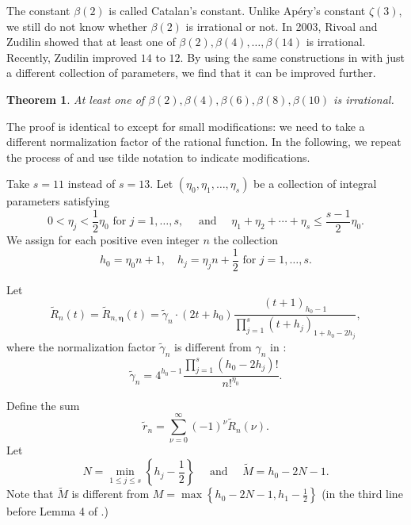 \documentclass[11pt]{amsart}
\newtheorem{theorem}{Theorem}[section]
\numberwithin{equation}{section}
\begin{document}
The constant $\beta(2)$ is called Catalan's constant. Unlike Ap{\'e}ry's constant $\zeta(3)$, we still do not know whether $\beta(2)$ is irrational or not. In 2003, Rivoal and Zudilin \cite{RZ03} showed that at least one of $\beta(2),\beta(4),\ldots,\beta(14)$ is irrational. Recently, Zudilin \cite{Zu19} improved $14$ to $12$. By using the same constructions in \cite{Zu19} with just a different collection of parameters, we find that it can be improved further.

\begin{theorem}\label{secondtheorem}
At least one of $\beta(2),\beta(4),\beta(6),\beta(8),\beta(10)$ is irrational.
\end{theorem}

The proof is identical to \cite[\S 3]{Zu19} except for small modifications: we need to take a different normalization factor of the rational function. In the following, we repeat the process of \cite[\S 3]{Zu19} and use tilde notation to indicate modifications.

Take $s=11$ instead of $s=13$. Let $(\eta_0,\eta_1,\ldots,\eta_{s})$ be a collection of integral parameters satisfying
\[ 0<\eta_{j}<\frac{1}{2} \eta_{0} \text {~for~} j=1, \ldots, s, \quad \text { and } \quad \eta_{1}+\eta_{2}+\cdots+\eta_{s} \leqslant \frac{s-1}{2} \eta_{0}. \]
We assign for each positive even integer $n$ the collection
\[ h_{0}=\eta_{0} n+1, \quad h_{j}=\eta_{j} n+\frac{1}{2} \text {~for~} j=1, \ldots, s. \]

Let
\[ \widetilde{R}_{n}(t)=\widetilde{R}_{n, \mathbf{\eta}}(t)=\widetilde{\gamma}_{n} \cdot\left(2 t+h_{0}\right) \frac{(t+1)_{h_{0}-1}}{\prod_{j=1}^{s}\left(t+h_{j}\right)_{1+h_{0}-2 h_{j}}}, \]
where the normalization factor $\widetilde{\gamma}_{n}$ is different from $\gamma_{n}$ in \cite[\S 3]{Zu19}:
\[ \widetilde{\gamma}_{n} =4^{h_{0}-1} \frac{\prod_{j=1}^{s}\left(h_{0}-2 h_{j}\right) !}{n !^{\eta_0}} .\]

Define the sum
\[ \widetilde{r}_{n}=\sum_{\nu=0}^{\infty} (-1)^{\nu} \widetilde{R}_{n}(\nu). \]
Let
\[ N=\min _{1 \leqslant j \leqslant s}\left\{h_{j}-\frac{1}{2}\right\} \quad \text { and } \quad \widetilde{M} = h_0 - 2N-1.  \]
Note that $\widetilde{M}$ is different from $M=\max \left\{h_{0}-2 N-1, h_{1}-\frac{1}{2}\right\}$ (in the third line before Lemma 4 of \cite[\S 3]{Zu19}.)
\end{document}
